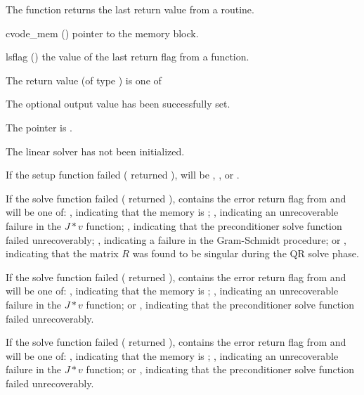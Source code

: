 {
  The function  returns the
  last return value from a {\cvspils} routine. 
}
{
  \begin{args}
  \item[cvode\_mem] ()
    pointer to the {\cvodes} memory block.
  \item[lsflag] ()
    the value of the last return flag from a {\cvspils} function.
  \end{args}
}
{
  The return value  (of type ) is one of
  \begin{args}
  \item[\Id{CVSPILS\_SUCCESS}] 
    The optional output value has been successfully set.
  \item[\Id{CVSPILS\_MEM\_NULL}]
    The  pointer is .
  \item[\Id{CVSPILS\_LMEM\_NULL}]
    The {\cvspils} linear solver has not been initialized.
  \end{args}
}
{
  If the {\cvspils} setup function failed ( returned
  ),  will be ,
  , or .

  If the {\cvspgmr} solve function failed ( returned
  ),  contains the error return flag from
   and will be one of:
  , indicating that the {\spgmr} memory is ;
  , indicating an unrecoverable failure in the 
  $J*v$ function;
  , indicating that the preconditioner solve
  function  failed unrecoverably;
  , indicating a failure in the Gram-Schmidt procedure; 
  or , indicating that the matrix $R$ was found to be
  singular during the QR solve phase.

  If the {\cvspbcg} solve function failed ( returned
  ),  contains the error return flag from
   and will be one of:
  , indicating that the {\spbcg} memory is ;
  , indicating an unrecoverable failure in the 
  $J*v$ function; or
  , indicating that the preconditioner solve
  function  failed unrecoverably.

  If the {\cvsptfqmr} solve function failed ( returned
  ),  contains the error return flag from
   and will be one of:
  , indicating that the {\sptfqmr} memory is ;
  , indicating an unrecoverable failure in the 
  $J*v$ function; or
  , indicating that the preconditioner solve
  function  failed unrecoverably.
}
